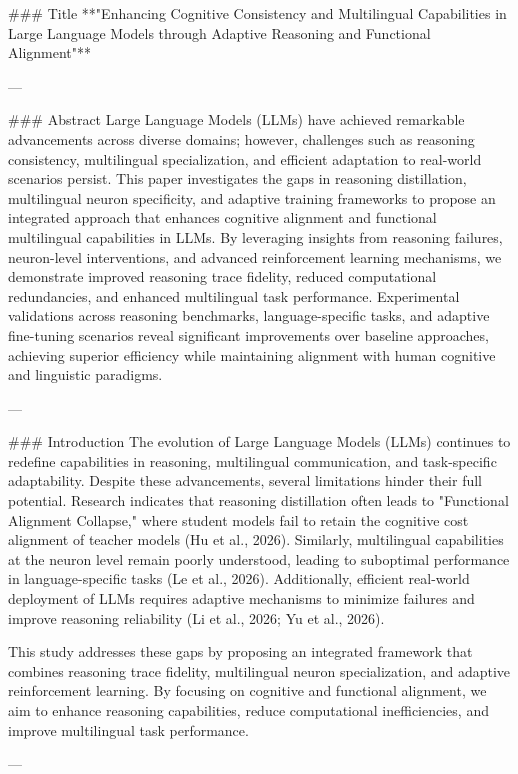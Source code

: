 ### Title
**"Enhancing Cognitive Consistency and Multilingual Capabilities in Large Language Models through Adaptive Reasoning and Functional Alignment"**

---

### Abstract
Large Language Models (LLMs) have achieved remarkable advancements across diverse domains; however, challenges such as reasoning consistency, multilingual specialization, and efficient adaptation to real-world scenarios persist. This paper investigates the gaps in reasoning distillation, multilingual neuron specificity, and adaptive training frameworks to propose an integrated approach that enhances cognitive alignment and functional multilingual capabilities in LLMs. By leveraging insights from reasoning failures, neuron-level interventions, and advanced reinforcement learning mechanisms, we demonstrate improved reasoning trace fidelity, reduced computational redundancies, and enhanced multilingual task performance. Experimental validations across reasoning benchmarks, language-specific tasks, and adaptive fine-tuning scenarios reveal significant improvements over baseline approaches, achieving superior efficiency while maintaining alignment with human cognitive and linguistic paradigms.

---

### Introduction
The evolution of Large Language Models (LLMs) continues to redefine capabilities in reasoning, multilingual communication, and task-specific adaptability. Despite these advancements, several limitations hinder their full potential. Research indicates that reasoning distillation often leads to "Functional Alignment Collapse," where student models fail to retain the cognitive cost alignment of teacher models (Hu et al., 2026). Similarly, multilingual capabilities at the neuron level remain poorly understood, leading to suboptimal performance in language-specific tasks (Le et al., 2026). Additionally, efficient real-world deployment of LLMs requires adaptive mechanisms to minimize failures and improve reasoning reliability (Li et al., 2026; Yu et al., 2026). 

This study addresses these gaps by proposing an integrated framework that combines reasoning trace fidelity, multilingual neuron specialization, and adaptive reinforcement learning. By focusing on cognitive and functional alignment, we aim to enhance reasoning capabilities, reduce computational inefficiencies, and improve multilingual task performance.

---

